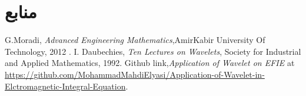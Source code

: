 \documentclass[12pt,a4paper]{article}
\begin{document}
\section{منابع}

\begin{thebibliography}{99}
     G.Moradi, \textit{Advanced Engineering Mathematics},AmirKabir University Of Technology, 2012 .
     I. Daubechies, \textit{Ten Lectures on Wavelets}, Society for Industrial and Applied Mathematics, 1992.
     Github link,\textit{Application of Wavelet on EFIE} at \url{https://github.com/MohammadMahdiElyasi/Application-of-Wavelet-in-Elctromagnetic-Integral-Equation}.

\end{thebibliography}
\end{document}
